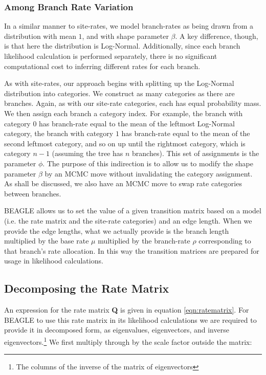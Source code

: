 \documentclass[10pt,journal,compsoc]{IEEEtran}
\begin{document}
\subsubsection{Among Branch Rate Variation}

In a similar manner to site-rates, we model branch-rates as being drawn from a distribution with mean $1$, and with shape parameter $\beta$. A key difference, though, is that here the distribution is Log-Normal. Additionally, since each branch likelihood calculation is performed separately, there is no significant computational cost to inferring different rates for each branch\cite{drummond2006relaxed}.

As with site-rates, our approach begins with splitting up the Log-Normal distribution into categories. We construct as many categories as there are branches. Again, as with our site-rate categories, each has equal probability mass. We then assign each branch a category index. For example, the branch with category $0$ has branch-rate equal to the mean of the leftmost Log-Normal category, the branch with category $1$ has branch-rate equal to the mean of the second leftmost category, and so on up until the rightmost category, which is category $n - 1$ (assuming the tree has $n$ branches). This set of assignments is the parameter $\phi$. The purpose of this indirection is to allow us to modify the shape parameter $\beta$ by an MCMC move without invalidating the category assignment. As shall be discussed, we also have an MCMC move to swap rate categories between branches.

BEAGLE allows us to set the value of a given transition matrix based on a model (i.e. the rate matrix and the site-rate categories) and an edge length. When we provide the edge lengths, what we actually provide is the branch length multiplied by the base rate $\mu$ multiplied by the branch-rate $\rho$ corresponding to that branch's rate allocation. In this way the transition matrices are prepared for usage in likelihood calculations.

\subsection{Decomposing the Rate Matrix}

An expression for the rate matrix \textbf{Q} is given in equation \eqref{eqn:ratematrix}. For BEAGLE to use this rate matrix in its likelihood calculations we are required to provide it in decomposed form, as eigenvalues, eigenvectors, and inverse eigenvectors.\footnote{The columns of the inverse of the matrix of eigenvectors} We first multiply through by the scale factor outside the matrix:
\end{document}
